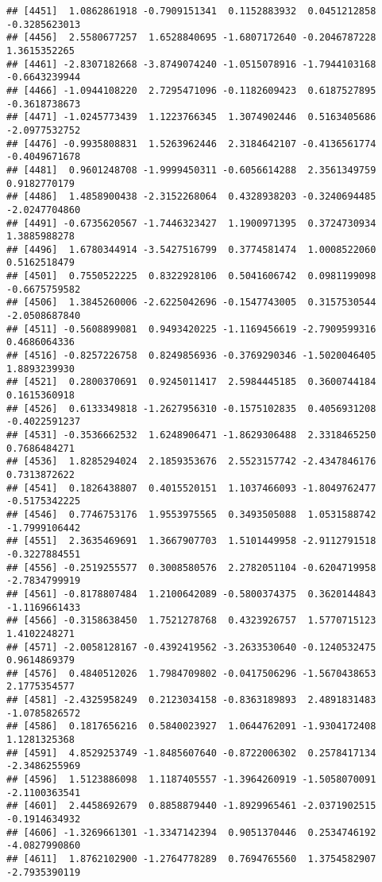 \documentclass[
]{article}
\begin{document}
\begin{verbatim}
## [4451]  1.0862861918 -0.7909151341  0.1152883932  0.0451212858 -0.3285623013
## [4456]  2.5580677257  1.6528840695 -1.6807172640 -0.2046787228  1.3615352265
## [4461] -2.8307182668 -3.8749074240 -1.0515078916 -1.7944103168 -0.6643239944
## [4466] -1.0944108220  2.7295471096 -0.1182609423  0.6187527895 -0.3618738673
## [4471] -1.0245773439  1.1223766345  1.3074902446  0.5163405686 -2.0977532752
## [4476] -0.9935808831  1.5263962446  2.3184642107 -0.4136561774 -0.4049671678
## [4481]  0.9601248708 -1.9999450311 -0.6056614288  2.3561349759  0.9182770179
## [4486]  1.4858900438 -2.3152268064  0.4328938203 -0.3240694485 -2.0247704860
## [4491] -0.6735620567 -1.7446323427  1.1900971395  0.3724730934  1.3885988278
## [4496]  1.6780344914 -3.5427516799  0.3774581474  1.0008522060  0.5162518479
## [4501]  0.7550522225  0.8322928106  0.5041606742  0.0981199098 -0.6675759582
## [4506]  1.3845260006 -2.6225042696 -0.1547743005  0.3157530544 -2.0508687840
## [4511] -0.5608899081  0.9493420225 -1.1169456619 -2.7909599316  0.4686064336
## [4516] -0.8257226758  0.8249856936 -0.3769290346 -1.5020046405  1.8893239930
## [4521]  0.2800370691  0.9245011417  2.5984445185  0.3600744184  0.1615360918
## [4526]  0.6133349818 -1.2627956310 -0.1575102835  0.4056931208 -0.4022591237
## [4531] -0.3536662532  1.6248906471 -1.8629306488  2.3318465250  0.7686484271
## [4536]  1.8285294024  2.1859353676  2.5523157742 -2.4347846176  0.7313872622
## [4541]  0.1826438807  0.4015520151  1.1037466093 -1.8049762477 -0.5175342225
## [4546]  0.7746753176  1.9553975565  0.3493505088  1.0531588742 -1.7999106442
## [4551]  2.3635469691  1.3667907703  1.5101449958 -2.9112791518 -0.3227884551
## [4556] -0.2519255577  0.3008580576  2.2782051104 -0.6204719958 -2.7834799919
## [4561] -0.8178807484  1.2100642089 -0.5800374375  0.3620144843 -1.1169661433
## [4566] -0.3158638450  1.7521278768  0.4323926757  1.5770715123  1.4102248271
## [4571] -2.0058128167 -0.4392419562 -3.2633530640 -0.1240532475  0.9614869379
## [4576]  0.4840512026  1.7984709802 -0.0417506296 -1.5670438653  2.1775354577
## [4581] -2.4325958249  0.2123034158 -0.8363189893  2.4891831483 -1.0785826572
## [4586]  0.1817656216  0.5840023927  1.0644762091 -1.9304172408  1.1281325368
## [4591]  4.8529253749 -1.8485607640 -0.8722006302  0.2578417134 -2.3486255969
## [4596]  1.5123886098  1.1187405557 -1.3964260919 -1.5058070091 -2.1100363541
## [4601]  2.4458692679  0.8858879440 -1.8929965461 -2.0371902515 -0.1914634932
## [4606] -1.3269661301 -1.3347142394  0.9051370446  0.2534746192 -4.0827990860
## [4611]  1.8762102900 -1.2764778289  0.7694765560  1.3754582907 -2.7935390119

\end{verbatim}
\end{document}
